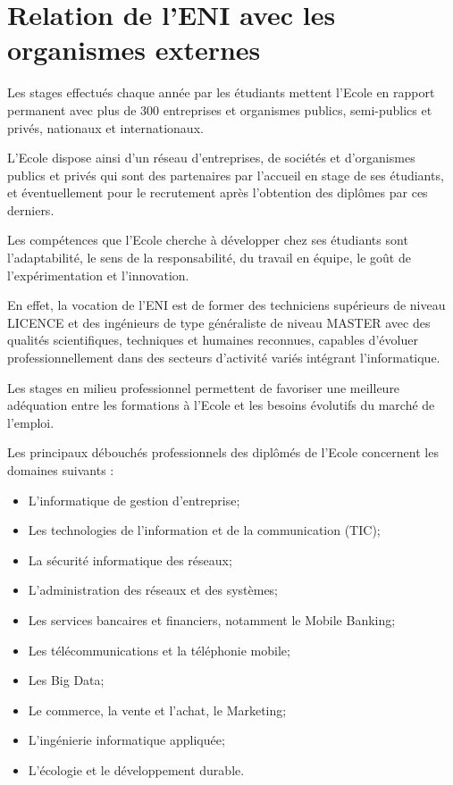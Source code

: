 \documentclass[12pt]{report}
\begin{document}
				\section{Relation de l’ENI avec les organismes externes}
				
				Les stages effectués chaque année par les étudiants mettent l’Ecole en rapport permanent avec plus de 300 entreprises et organismes publics, semi-publics et privés, nationaux et internationaux.

				L’Ecole dispose ainsi d’un réseau d’entreprises, de sociétés et d’organismes publics et privés qui sont des partenaires par l’accueil en stage de ses étudiants, et éventuellement pour le recrutement après l’obtention des diplômes par ces derniers.

				Les compétences que l’Ecole cherche à développer chez ses étudiants sont l’adaptabilité, le sens de la responsabilité, du travail en équipe, le goût de l’expérimentation et l’innovation. 

				En effet, la vocation de l’ENI est de former des techniciens supérieurs de niveau LICENCE et des ingénieurs de type généraliste de niveau MASTER avec des qualités scientifiques, techniques et humaines reconnues, capables d’évoluer professionnellement dans des secteurs d’activité variés intégrant l’informatique.

				Les stages en milieu professionnel permettent de favoriser une meilleure adéquation entre les formations à l’Ecole et les besoins évolutifs du marché de l’emploi. 

				\begin{center}
					\begin{minipage}{\textwidth}
						\indent Les principaux débouchés professionnels des diplômés de l’Ecole concernent les domaines suivants :
						\begin{itemize}
							\item L’informatique de gestion d’entreprise;
							\item Les technologies de l’information et de la communication (TIC);
							\item La sécurité informatique des réseaux;
							\item L’administration des réseaux et des systèmes;
							\item Les services bancaires et financiers, notamment le Mobile Banking;
							\item Les télécommunications et la téléphonie mobile;
							\item Les Big Data;
							\item Le commerce, la vente et l’achat, le Marketing;
							\item L’ingénierie informatique appliquée;
							\item L’écologie et le développement durable.\\
						\end{itemize}
					\end{minipage}
				\end{center}
\end{document}
